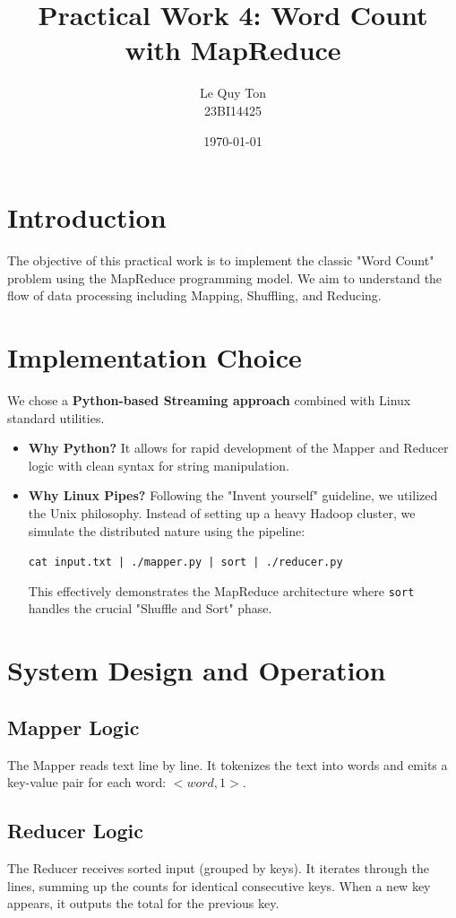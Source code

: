 \documentclass[a4paper,12pt]{article}
\title{Practical Work 4: Word Count with MapReduce}
\author{Le Quy Ton \\ 23BI14425}
\date{\today}
\begin{document}
\maketitle

\section{Introduction}
The objective of this practical work is to implement the classic "Word Count" problem using the MapReduce programming model. We aim to understand the flow of data processing including Mapping, Shuffling, and Reducing.

\section{Implementation Choice}
We chose a \textbf{Python-based Streaming approach} combined with Linux standard utilities.
\begin{itemize}
    \item \textbf{Why Python?} It allows for rapid development of the Mapper and Reducer logic with clean syntax for string manipulation.
    \item \textbf{Why Linux Pipes?} Following the "Invent yourself" guideline, we utilized the Unix philosophy. Instead of setting up a heavy Hadoop cluster, we simulate the distributed nature using the pipeline:
    \begin{center}
        \texttt{cat input.txt | ./mapper.py | sort | ./reducer.py}
    \end{center}
    This effectively demonstrates the MapReduce architecture where \texttt{sort} handles the crucial "Shuffle and Sort" phase.
\end{itemize}

\section{System Design and Operation}

\subsection{Mapper Logic}
The Mapper reads text line by line. It tokenizes the text into words and emits a key-value pair for each word: $<word, 1>$.

\subsection{Reducer Logic}
The Reducer receives sorted input (grouped by keys). It iterates through the lines, summing up the counts for identical consecutive keys. When a new key appears, it outputs the total for the previous key.
\end{document}
